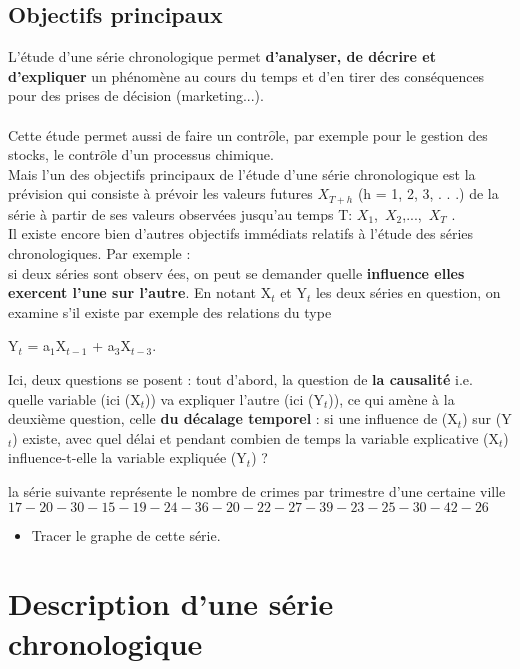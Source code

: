 \documentclass[a4paper,12pt,freqn]{report}
\theoremstyle{plain}
\begin{document}
\subsection{Objectifs principaux}
L'\'{e}tude d'une s\'{e}rie chronologique permet \textbf{d'analyser, de d\'{e}crire et d'expliquer} un ph\'{e}nom\`{e}ne au cours
du temps et d'en tirer des cons\'{e}quences pour des prises de d\'{e}cision (marketing...). \\
\\ Cette \'{e}tude permet aussi de faire un contr$\hat{o}$le, par exemple pour le gestion des stocks, le contr$\hat{o}$le d'un
processus chimique.\\
Mais l'un des objectifs principaux de l'\'{e}tude d'une s\'{e}rie chronologique est la pr\'{e}vision qui consiste \`{a}
pr\'{e}voir les valeurs futures $X_{T+h}$ (h = 1, 2, 3, . . .) de la s\'{e}rie \`{a} partir de ses valeurs observ\'{e}es
jusqu'au temps T: $X_{1}$,\ $X_{2}$,...,\ $X_{T}$ .\\
Il existe encore bien d'autres objectifs imm\'{e}diats relatifs \`{a} l'\'{e}tude des s\'{e}ries chronologiques. Par exemple : \\

 si deux s\'{e}ries sont observ%
 \'{e}es, on peut se demander quelle \textbf{influence elles exercent l'une
sur l'autre}. En notant X$_{t}$ et Y$_{t}$ les deux s\'{e}ries en question,
on examine s'il existe par exemple des relations du type

Y$_{t}$ = a$_{1}$X$_{t-1}$ + a$_{3}$X$_{t-3}$.

Ici, deux questions se posent : tout d'abord, la question de \textbf{la
causalit\'{e}} i.e. quelle variable (ici (X$_{t}$)) va expliquer l'autre
(ici (Y$_{t}$)), ce qui am\`{e}ne \`{a} la deuxi\`{e}me question, celle \textbf{du
d\'{e}calage temporel} : si une influence de (X$_{t}$) sur (Y$_{t}$) existe,
avec quel d\'{e}lai et pendant combien de temps la variable explicative (X$%
_{t}$) influence-t-elle la variable expliqu\'{e}e (Y$_{t}$) ?

la s\'{e}rie suivante repr\'{e}sente le nombre de crimes par trimestre d'une certaine ville  $17-20-30-15-19-24-36-20-22-27-39-23-25-30-42-26$
\begin{itemize}
  \item Tracer le graphe de cette s\'{e}rie.
\end{itemize}

\bigskip

\bigskip
\newpage
\section{\textbf{ Description d'une s\'{e}rie chronologique}}
\end{document}
